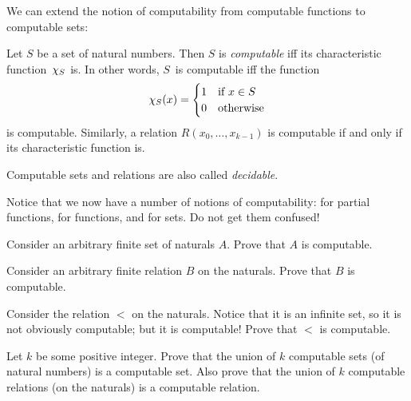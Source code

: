 \documentclass[../../../include/open-logic-section]{subfiles}
\begin{document}

We can extend the notion of computability from computable functions to
computable sets:

\begin{defn}
  Let $S$ be a set of natural numbers. Then $S$ is \emph{computable}
  iff its characteristic function~$\chi_{S}$ is. In other words,
  $S$~is computable iff the function
\[
\chi_{S}(x) =
\begin{cases}
1 & \text{if $x \in S$} \\
0 & \text{otherwise}
\end{cases}
\]
is computable. Similarly, a relation $R(x_0, \dots, x_{k-1})$ is
computable if and only if its characteristic function is.

Computable sets and relations are also called \emph{decidable}.
\end{defn}

\begin{explain}
Notice that we now have a number of notions of computability: for
partial functions, for functions, and for sets. Do not get them
confused!{} 
\end{explain}

\begin{prob}
  Consider an arbitrary finite set of naturals $A$. Prove that $A$ is computable.
\end{prob}

\begin{prob}
  Consider an arbitrary finite relation $B$ on the naturals. Prove that $B$ is computable.
\end{prob}

\begin{prob}
  Consider the relation $<$ on the naturals. Notice that it is an infinite set, so it is not obviously computable; but it is computable! Prove that $<$ is computable.
\end{prob}

\begin{prob}
  Let $k$ be some positive integer. Prove that the union of $k$ computable sets (of natural numbers) is a computable set. Also prove that the union of $k$ computable relations (on the naturals) is a computable relation.
\end{prob}
\end{document}
